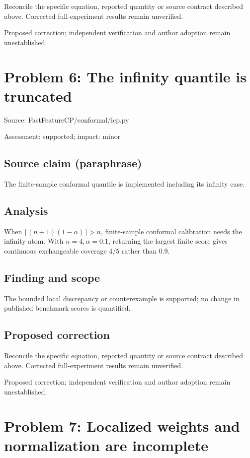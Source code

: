 \documentclass[11pt]{article}
\begin{document}
Reconcile the specific equation, reported quantity or source contract described above. Corrected full-experiment results remain unverified.

Proposed correction; independent verification and author adoption remain unestablished.

\section*{Problem 6: The infinity quantile is truncated}

Source: FastFeatureCP/conformal/icp.py

Assessment: supported; impact: minor

\subsection*{Source claim (paraphrase)}

The finite-sample conformal quantile is implemented including its infinity case.

\subsection*{Analysis}

When \(\lceil(n+1)(1-\alpha)\rceil>n\), finite-sample conformal calibration needs the infinity atom. With \(n=4,\alpha=0.1\), returning the largest finite score gives continuous exchangeable coverage \(4\)/\(5\) rather than 0.9.

\subsection*{Finding and scope}

The bounded local discrepancy or counterexample is supported; no change in published benchmark scores is quantified.

\subsection*{Proposed correction}

Reconcile the specific equation, reported quantity or source contract described above. Corrected full-experiment results remain unverified.

Proposed correction; independent verification and author adoption remain unestablished.

\section*{Problem 7: Localized weights and normalization are incomplete}
\end{document}
